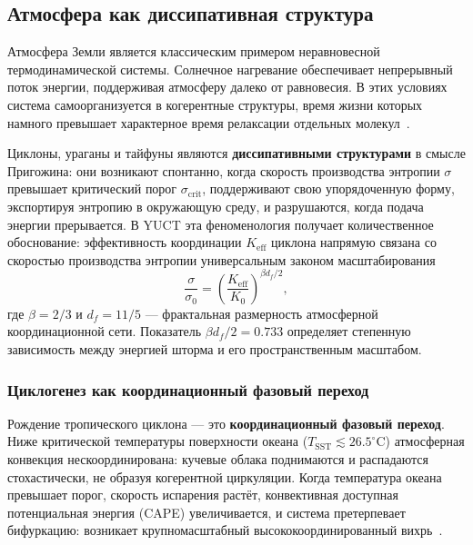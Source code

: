 \documentclass[12pt,a4paper]{article}
\newcommand{\Keff}{K_{\mathrm{eff}}}
\begin{document}
	\subsection{Атмосфера как диссипативная структура}
	\label{subsec:atmo_diss}
	
	Атмосфера Земли является классическим примером неравновесной термодинамической системы. Солнечное нагревание обеспечивает непрерывный поток энергии, поддерживая атмосферу далеко от равновесия. В этих условиях система самоорганизуется в когерентные структуры, время жизни которых намного превышает характерное время релаксации отдельных молекул~\cite{Prigogine1977}.
	
	Циклоны, ураганы и тайфуны являются \textbf{диссипативными структурами} в смысле Пригожина: они возникают спонтанно, когда скорость производства энтропии $\sigma$ превышает критический порог $\sigma_{\mathrm{crit}}$, поддерживают свою упорядоченную форму, экспортируя энтропию в окружающую среду, и разрушаются, когда подача энергии прерывается. В YUCT эта феноменология получает количественное обоснование: эффективность координации $\Keff$ циклона напрямую связана со скоростью производства энтропии универсальным законом масштабирования
	\begin{equation}
		\frac{\sigma}{\sigma_0} = \left( \frac{\Keff}{K_0} \right)^{\beta d_f / 2},
		\label{eq:cyclone_sigma}
	\end{equation}
	где $\beta = 2/3$ и $d_f = 11/5$ — фрактальная размерность атмосферной координационной сети. Показатель $\beta d_f / 2 = 0.733$ определяет степенную зависимость между энергией шторма и его пространственным масштабом.
	
	\subsubsection*{Циклогенез как координационный фазовый переход}
	
	Рождение тропического циклона — это \textbf{координационный фазовый переход}. Ниже критической температуры поверхности океана ($T_{\mathrm{SST}} \lesssim 26.5^{\circ}\mathrm{C}$) атмосферная конвекция нескоординирована: кучевые облака поднимаются и распадаются стохастически, не образуя когерентной циркуляции. Когда температура океана превышает порог, скорость испарения растёт, конвективная доступная потенциальная энергия (CAPE) увеличивается, и система претерпевает бифуркацию: возникает крупномасштабный высококоординированный вихрь~\cite{Emanuel2003}.
	
\end{document}
